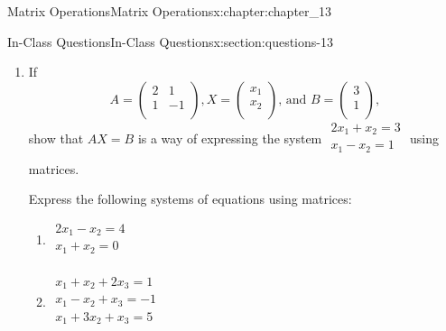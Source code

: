 \documentclass[oneside,10pt,]{book}
\numberwithin{equation}{section}
\begin{document}
\begin{chapterptx}{Matrix Operations}{}{Matrix Operations}{}{}{x:chapter:chapter_13}
\begin{sectionptx}{In-Class Questions}{}{In-Class Questions}{}{}{x:section:questions-13}
\begin{enumerate}[label=\arabic*.]
\begin{enumerate}[label=(\alph*)]
\item{}Given the following matrix, what useful information might you get from the products \(A A^t\) or \(A^t A\).?%
\begin{equation*}
A=\left(
\begin{array}{ccccc}
16 &11 &4 &3 &15 \\
16 &17 &13 &12 &6 \\
\end{array}
\right) 
\end{equation*}
%
\end{enumerate}
%
\item{}If%
\begin{equation*}
A =\left(
\begin{array}{cc}
2 & 1 \\
1 & -1 \\
\end{array}
\right), X =\left(
\begin{array}{c}
x_1 \\
x_2 \\
\end{array}
\right)\textrm{, and }B =\left(
\begin{array}{c}
3 \\
1 \\
\end{array}
\right),
\end{equation*}
show that \(A X =B\) is a way of expressing the system \(\begin{array}{c}2x_1 + x_2 = 3\\ x_1 - x_2= 1\\
\end{array}\)  using matrices.%
\par
Express the following systems of equations using matrices:%
\par
%
\begin{multicols}{2}
\begin{enumerate}[label=(\alph*)]
\item{}\(\begin{array}{c}
2 x_1- x_2= 4\\
x_1+ x_2= 0\\
\end{array}\)%
\item{}\(\begin{array}{c}
x_1+ x_2+ 2 x_3= 1\\
x_1- x_2+ x_3= -1\\
x_1+ 3 x_2+x_3= 5\\
\end{array}\)%

\end{enumerate}
\end{multicols}
\end{enumerate}
\end{sectionptx}
\end{chapterptx}
\end{document}

